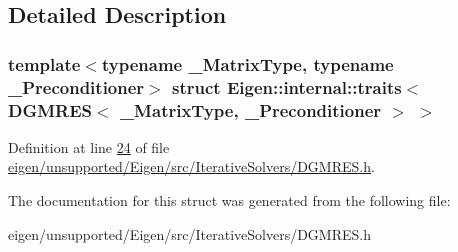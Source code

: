 \subsection{Detailed Description}
\subsubsection*{template$<$typename \+\_\+\+Matrix\+Type, typename \+\_\+\+Preconditioner$>$\newline
struct Eigen\+::internal\+::traits$<$ D\+G\+M\+R\+E\+S$<$ \+\_\+\+Matrix\+Type, \+\_\+\+Preconditioner $>$ $>$}



Definition at line \hyperlink{eigen_2unsupported_2_eigen_2src_2_iterative_solvers_2_d_g_m_r_e_s_8h_source_l00024}{24} of file \hyperlink{eigen_2unsupported_2_eigen_2src_2_iterative_solvers_2_d_g_m_r_e_s_8h_source}{eigen/unsupported/\+Eigen/src/\+Iterative\+Solvers/\+D\+G\+M\+R\+E\+S.\+h}.



The documentation for this struct was generated from the following file\+:\begin{DoxyCompactItemize}
\item 
eigen/unsupported/\+Eigen/src/\+Iterative\+Solvers/\+D\+G\+M\+R\+E\+S.\+h\end{DoxyCompactItemize}
